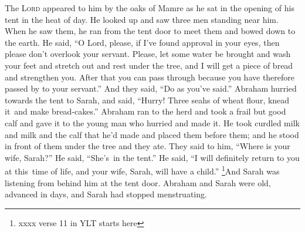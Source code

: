 
\begin{inparaenum}
     The \textsc{Lord} appeared to him by the oaks of Mamre as he sat in the opening of his tent in the heat of day.%
     He looked up and saw three men standing near him. When he saw them, he ran from the tent door to meet them and bowed down to the earth.%
     He said, ``O Lord, please, if I've found approval in your eyes, then please don't overlook your servant.%
     Please, let some water be brought and wash your feet and stretch out and rest under the tree,%
     and I will get a piece of bread and strengthen you. After that you can pass through because you have therefore passed by to your servant.'' And they said, ``Do as you've said.''%
     Abraham hurried towards the tent to Sarah, and said, ``Hurry! Three seahs of wheat flour, knead it\understood\ and make bread-cakes.''%
     Abraham ran to the herd and took a frail but good calf and gave it to the young man who hurried and made it.%
     He took curdled milk and milk and the calf that he'd made and placed them before them; and he stood in front of them under the tree and they ate.%
     They said to him, ``Where is your wife, Sarah?'' He said, ``She's\understood\ in the tent.''%
     He said, ``I will definitely return to you at this\understood\ time of life, and your wife, Sarah, will have a child.'' \footnote{xxxx verse 11 in YLT starts here}And Sarah was listening from behind him at the tent door.%
     Abraham and Sarah were old, advanced in days, and Sarah had stopped menstruating.%
\end{inparaenum}
